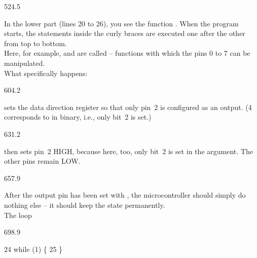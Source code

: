 \documentclass{aslab}
\makeatletter
\newcommand*\aN[1]{\textcolor{codeorange}{#1}}%
\newcommand*\aK[1]{\textcolor{codered}{#1}}%
\newenvironment{asmlisting}[1][11]{\par
  \edef\asm@bs{\the\baselineskip}\fontsize{#1bp}{\asm@bs}\selectfont
  \ttfamily\asm@setup}{\par}
\makeatother
\begin{document}
\begin{region}[pitch=13.36]{524.5}
\begin{dashlist}
\item In the lower part (lines 20 to 26), you see the function .
  When the program starts, the statements inside the curly braces are
  executed one after the other from top to bottom.\\
  Here, for example,  and  are
  called -- functions with which the pins 0 to 7 can be manipulated.\\
  What specifically happens:
\end{dashlist}
\end{region}

\begin{region}[x=68.7,right=0,pitch=14.1]{604.2}
\begin{dashlist}
\item {} sets the data direction register so that only
  pin~2 is configured as an output. (4 corresponds to  in
  binary, i.e., only bit~2 is set.)
\end{dashlist}
\end{region}

\begin{region}[x=68.7,right=0,pitch=13.8]{631.2}
\begin{dashlist}
\item {} then sets pin~2 HIGH, because here, too,
  only bit~2 is set in the argument. The other pins remain LOW.
\end{dashlist}
\end{region}

\begin{region}[x=68.7,right=0,pitch=13.5]{657.9}
\begin{dashlist}
\item After the output pin has been set with , the
  microcontroller should simply do nothing else -- it should keep the state
  permanently.\\
  The loop
\end{dashlist}
\end{region}

\begin{region}[x=80.7,right=0,pitch=11]{698.9}
\begin{asmlisting}[9]
\aN{24}     while (\aK{1}) \{
\aN{25}     \}
\end{asmlisting}
\end{region}
\end{document}
